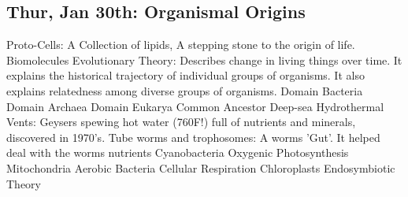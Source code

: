 \documentclass[10pt, oneside]{article}
\begin{document}
\subsection{Thur, Jan 30th: Organismal Origins}

 Proto-Cells: A Collection of lipids, A stepping stone to the origin of life.
 Biomolecules
 Evolutionary Theory: Describes change in living things over time. It explains the historical trajectory of individual groups of organisms. It also explains relatedness among diverse groups of organisms.
 Domain Bacteria
 Domain Archaea
 Domain Eukarya
 Common Ancestor
 Deep-sea Hydrothermal Vents: Geysers spewing hot water (760F!) full of nutrients and minerals, discovered in 1970's.
 Tube worms and trophosomes: A worms 'Gut'. It helped deal with the worms nutrients
 Cyanobacteria 
 Oxygenic Photosynthesis
 Mitochondria
 Aerobic Bacteria
 Cellular Respiration
 Chloroplasts
 Endosymbiotic Theory
\end{document}
